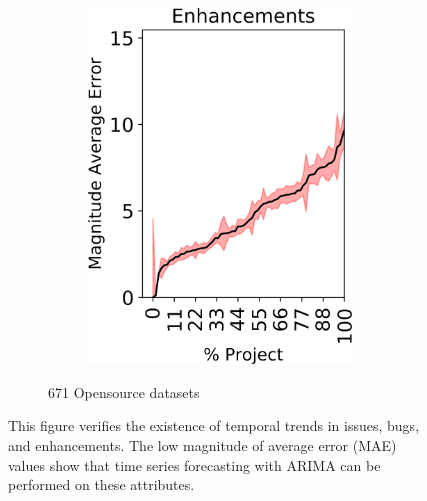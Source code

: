 \begin{figure}[tp!]
\begin{subfigure}[t]{\linewidth}
\begin{subfigure}[t]{0.33\linewidth}
		\includegraphics[width=\linewidth]{images/RQ1/opensrc/Enhancements.png}
	\end{subfigure}%
	\caption{671 Opensource datasets}
	\end{subfigure}
	\caption{This figure verifies the existence of temporal trends in issues, bugs, and enhancements. The low magnitude of average error (MAE) values show that time series forecasting with ARIMA can be performed on these attributes.}
	\label{fig:rq1}
\end{figure}
